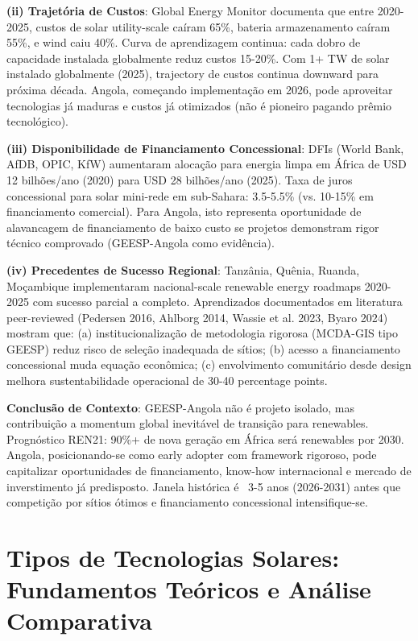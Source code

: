 \documentclass[12pt, a4paper]{article}
\begin{document}
\textbf{(ii) Trajetória de Custos}: Global Energy Monitor documenta que entre 2020-2025, custos de solar utility-scale caíram 65\%, bateria armazenamento caíram 55\%, e wind caiu 40\%. Curva de aprendizagem continua: cada dobro de capacidade instalada globalmente reduz custos 15-20\%. Com 1+ TW de solar instalado globalmente (2025), trajectory de custos continua downward para próxima década. Angola, começando implementação em 2026, pode aproveitar tecnologias já maduras e custos já otimizados (não é pioneiro pagando prêmio tecnológico).

\textbf{(iii) Disponibilidade de Financiamento Concessional}: DFIs (World Bank, AfDB, OPIC, KfW) aumentaram alocação para energia limpa em África de USD 12 bilhões/ano (2020) para USD 28 bilhões/ano (2025). Taxa de juros concessional para solar mini-rede em sub-Sahara: 3.5-5.5\% (vs. 10-15\% em financiamento comercial). Para Angola, isto representa oportunidade de alavancagem de financiamento de baixo custo se projetos demonstram rigor técnico comprovado (GEESP-Angola como evidência).

\textbf{(iv) Precedentes de Sucesso Regional}: Tanzânia, Quênia, Ruanda, Moçambique implementaram nacional-scale renewable energy roadmaps 2020-2025 com sucesso parcial a completo. Aprendizados documentados em literatura peer-reviewed (Pedersen 2016, Ahlborg 2014, Wassie et al. 2023, Byaro 2024) mostram que: (a) institucionalização de metodologia rigorosa (MCDA-GIS tipo GEESP) reduz risco de seleção inadequada de sítios; (b) acesso a financiamento concessional muda equação econômica; (c) envolvimento comunitário desde design melhora sustentabilidade operacional de 30-40 percentage points.

\textbf{Conclusão de Contexto}: GEESP-Angola não é projeto isolado, mas contribuição a momentum global inevitável de transição para renewables. Prognóstico REN21: 90\%+ de nova geração em África será renewables por 2030. Angola, posicionando-se como early adopter com framework rigoroso, pode capitalizar oportunidades de financiamento, know-how internacional e mercado de inverstimento já predisposto. Janela histórica é ~3-5 anos (2026-2031) antes que competição por sítios ótimos e financiamento concessional intensifique-se.



\section{Tipos de Tecnologias Solares: Fundamentos Teóricos e Análise Comparativa}
\end{document}
